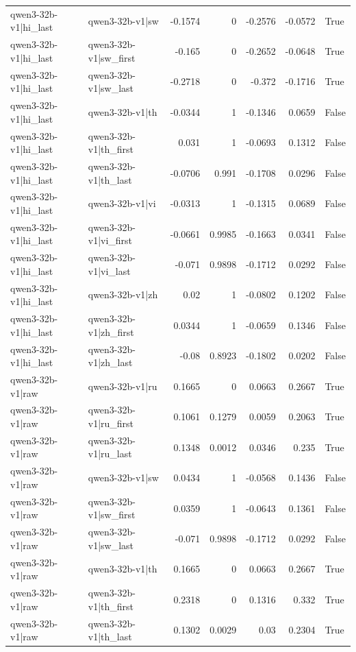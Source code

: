 \begin{table}
\begin{tabular}{l l r r r r l}
qwen3-32b-v1|hi_last & qwen3-32b-v1|sw & -0.1574 & 0 & -0.2576 & -0.0572 & True \\
qwen3-32b-v1|hi_last & qwen3-32b-v1|sw_first & -0.165 & 0 & -0.2652 & -0.0648 & True \\
qwen3-32b-v1|hi_last & qwen3-32b-v1|sw_last & -0.2718 & 0 & -0.372 & -0.1716 & True \\
qwen3-32b-v1|hi_last & qwen3-32b-v1|th & -0.0344 & 1 & -0.1346 & 0.0659 & False \\
qwen3-32b-v1|hi_last & qwen3-32b-v1|th_first & 0.031 & 1 & -0.0693 & 0.1312 & False \\
qwen3-32b-v1|hi_last & qwen3-32b-v1|th_last & -0.0706 & 0.991 & -0.1708 & 0.0296 & False \\
qwen3-32b-v1|hi_last & qwen3-32b-v1|vi & -0.0313 & 1 & -0.1315 & 0.0689 & False \\
qwen3-32b-v1|hi_last & qwen3-32b-v1|vi_first & -0.0661 & 0.9985 & -0.1663 & 0.0341 & False \\
qwen3-32b-v1|hi_last & qwen3-32b-v1|vi_last & -0.071 & 0.9898 & -0.1712 & 0.0292 & False \\
qwen3-32b-v1|hi_last & qwen3-32b-v1|zh & 0.02 & 1 & -0.0802 & 0.1202 & False \\
qwen3-32b-v1|hi_last & qwen3-32b-v1|zh_first & 0.0344 & 1 & -0.0659 & 0.1346 & False \\
qwen3-32b-v1|hi_last & qwen3-32b-v1|zh_last & -0.08 & 0.8923 & -0.1802 & 0.0202 & False \\
qwen3-32b-v1|raw & qwen3-32b-v1|ru & 0.1665 & 0 & 0.0663 & 0.2667 & True \\
qwen3-32b-v1|raw & qwen3-32b-v1|ru_first & 0.1061 & 0.1279 & 0.0059 & 0.2063 & True \\
qwen3-32b-v1|raw & qwen3-32b-v1|ru_last & 0.1348 & 0.0012 & 0.0346 & 0.235 & True \\
qwen3-32b-v1|raw & qwen3-32b-v1|sw & 0.0434 & 1 & -0.0568 & 0.1436 & False \\
qwen3-32b-v1|raw & qwen3-32b-v1|sw_first & 0.0359 & 1 & -0.0643 & 0.1361 & False \\
qwen3-32b-v1|raw & qwen3-32b-v1|sw_last & -0.071 & 0.9898 & -0.1712 & 0.0292 & False \\
qwen3-32b-v1|raw & qwen3-32b-v1|th & 0.1665 & 0 & 0.0663 & 0.2667 & True \\
qwen3-32b-v1|raw & qwen3-32b-v1|th_first & 0.2318 & 0 & 0.1316 & 0.332 & True \\
qwen3-32b-v1|raw & qwen3-32b-v1|th_last & 0.1302 & 0.0029 & 0.03 & 0.2304 & True \\

\end{tabular}
\end{table}

